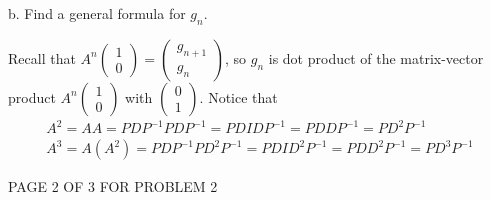 \documentclass[12pt]{article}
\newenvironment{solution}[1][Solution]
{
	\begin{trivlist} 
		\item[\hskip \labelsep {\itshape #1:}]
	}
	{
	\end{trivlist}
}
\begin{document}
\noindent
\newline
\newline
b. Find a general formula for $g_{n}$.
\begin{solution}
Recall that $A^{n} \begin{pmatrix}1\\0\end{pmatrix} = \begin{pmatrix}g_{n+1}\\g_{n}\end{pmatrix}$, so $g_{n}$ is dot product of the matrix-vector product $A^{n} \begin{pmatrix}1\\0\end{pmatrix}$ with $\begin{pmatrix}0\\1\end{pmatrix}$. Notice that
\begin{align*}
A^{2}=AA=P D P^{-1}P D P^{-1} = P D I D P^{-1}= P D D P^{-1}=P D^{2} P^{-1}\\
A^{3}=A(A^{2})=P D P^{-1}P D^{2} P^{-1} = P D I D^{2} P^{-1} = P D D^{2} P^{-1}=P D^{3} P^{-1}
\end{align*}
\vfill
\centerline{PAGE 2 OF 3 FOR PROBLEM 2}
\newpage

\end{solution}
\end{document}
